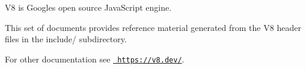 V8 is Google\textquotesingle{}s open source Java\+Script engine.

This set of documents provides reference material generated from the V8 header files in the include/ subdirectory.

For other documentation see \href{https://v8.dev/}{\texttt{ https\+://v8.\+dev/}}. 